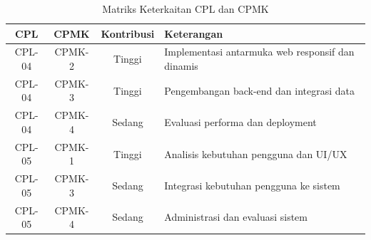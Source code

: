 \begin{table}[htbp]
\centering
\begin{tabular}{|c|c|c|P{6cm}|}
  \hline
  \textbf{CPL} & \textbf{CPMK} & \textbf{Kontribusi} & \textbf{Keterangan} \\
  \hline
  CPL-04 & CPMK-2 & Tinggi & Implementasi antarmuka web responsif dan dinamis \\
  \hline
  CPL-04 & CPMK-3 & Tinggi & Pengembangan back-end dan integrasi data \\
  \hline
  CPL-04 & CPMK-4 & Sedang & Evaluasi performa dan deployment \\
  \hline
  CPL-05 & CPMK-1 & Tinggi & Analisis kebutuhan pengguna dan UI/UX \\
  \hline
  CPL-05 & CPMK-3 & Sedang & Integrasi kebutuhan pengguna ke sistem \\
  \hline
  CPL-05 & CPMK-4 & Sedang & Administrasi dan evaluasi sistem \\
  \hline
\end{tabular}
\caption{Matriks Keterkaitan CPL dan CPMK}
\end{table}

\cleardoublepage

{}
\tableofcontents
\cleardoublepage

\clearpage
{}
{}
\listoffigures
\cleardoublepage

{}
\listoftables
\cleardoublepage

{}
\lstlistoflistings
\cleardoublepage

